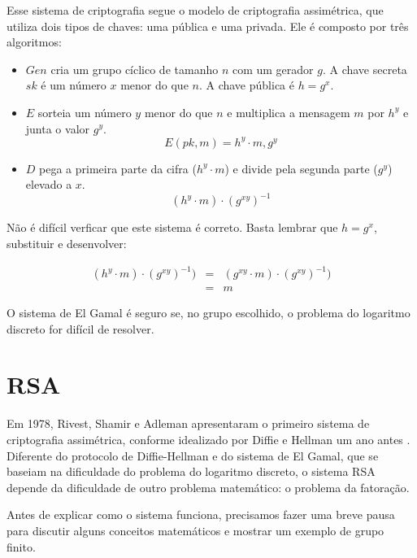 Esse sistema de criptografia segue o modelo de criptografia assimétrica, que utiliza dois tipos de chaves: uma pública e uma privada.
Ele é composto por três algoritmos:

\begin{itemize}
\item $Gen$ cria um grupo cíclico de tamanho $n$ com um gerador $g$.
  A chave secreta $sk$ é um número $x$ menor do que $n$.
  A chave pública é $h = g^x$.
\item $E$ sorteia um número $y$ menor do que $n$ e multiplica a mensagem $m$ por $h^y$ e junta o valor $g^y$.
  \begin{displaymath}
    E(pk, m) = h^y \cdot m, g^y
  \end{displaymath}
\item $D$ pega a primeira parte da cifra ($h^y \cdot m$) e divide pela segunda parte ($g^y$) elevado a $x$.
  \begin{displaymath}
    (h^y \cdot m) \cdot (g^{xy})^{-1}
  \end{displaymath}
\end{itemize}

Não é difícil verficar que este sistema é correto.
Basta lembrar que $h = g^x$, substituir e desenvolver:

\begin{eqnarray*}
  (h^y \cdot m) \cdot (g^{xy})^{-1}) & = & (g^{xy} \cdot m) \cdot (g^{xy})^{-1})\\
                                   & = & m
\end{eqnarray*}
  
O sistema de El Gamal é seguro se, no grupo escolhido, o problema do logaritmo discreto for difícil de resolver.

\section{RSA}
\label{sec:rsa}

Em 1978, Rivest, Shamir e Adleman apresentaram o primeiro sistema de criptografia assimétrica, conforme idealizado por Diffie e Hellman um ano antes \cite{Rivest78}.
Diferente do protocolo de Diffie-Hellman e do sistema de El Gamal, que se baseiam na dificuldade do problema do logaritmo discreto, o sistema RSA depende da dificuldade de outro problema matemático: o problema da fatoração.

Antes de explicar como o sistema funciona, precisamos fazer uma breve pausa para discutir alguns conceitos matemáticos e mostrar um exemplo de grupo finito.

